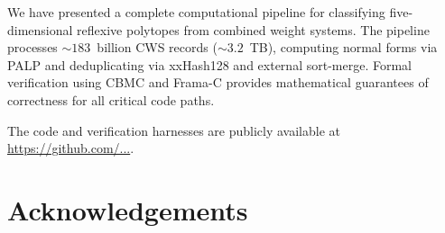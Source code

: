 \documentclass[12pt,a4paper]{article}
\theoremstyle{definition}
\begin{document}
We have presented a complete computational pipeline for classifying
five-dimensional reflexive polytopes from combined weight systems.
The pipeline processes $\sim 183$~billion CWS records ($\sim 3.2$~TB),
computing normal forms via PALP and deduplicating via xxHash128 and
external sort-merge.  Formal verification using CBMC and Frama-C
provides mathematical guarantees of correctness for all critical code
paths.


The code and verification harnesses are publicly available at
\url{https://github.com/...}.

\appendix


\section*{Acknowledgements}

\end{document}
